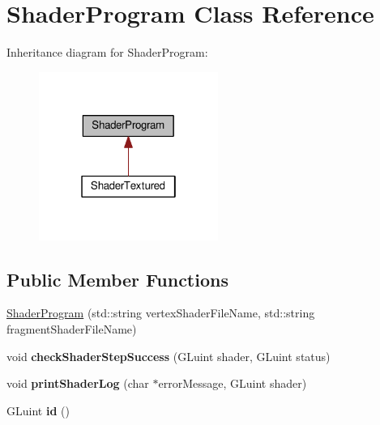 \hypertarget{classShaderProgram}{}\section{Shader\+Program Class Reference}
\label{classShaderProgram}


Inheritance diagram for Shader\+Program\+:
\nopagebreak
\begin{figure}[H]
\begin{center}
\leavevmode
\includegraphics[width=166pt]{classShaderProgram__inherit__graph}
\end{center}
\end{figure}
\subsection*{Public Member Functions}
\begin{DoxyCompactItemize}
\item 
\hyperlink{classShaderProgram_a1ebd997652d664bb4cfad4327dfc0ebf}{Shader\+Program} (std\+::string vertex\+Shader\+File\+Name, std\+::string fragment\+Shader\+File\+Name)
\item 
void {\bfseries check\+Shader\+Step\+Success} (G\+Luint shader, G\+Luint status)\hypertarget{classShaderProgram_a266426e0200266b6776e8a5a8b1506b0}{}\label{classShaderProgram_a266426e0200266b6776e8a5a8b1506b0}

\item 
void {\bfseries print\+Shader\+Log} (char $\ast$error\+Message, G\+Luint shader)\hypertarget{classShaderProgram_ab9aaa0cdb43bd9de8a370e2869354a8a}{}\label{classShaderProgram_ab9aaa0cdb43bd9de8a370e2869354a8a}

\item 
G\+Luint {\bfseries id} ()\hypertarget{classShaderProgram_a190a33eec6ed3138a6d94a7305a9e831}{}\label{classShaderProgram_a190a33eec6ed3138a6d94a7305a9e831}

\end{DoxyCompactItemize}
